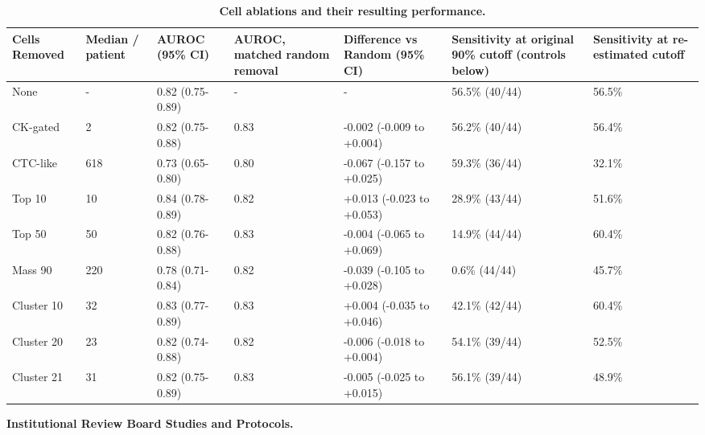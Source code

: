 \documentclass[11pt]{article}
\begin{document}
\clearpage
\begin{table}[p]
\centering
\caption{\textbf{Cell ablations and their resulting performance.}}
\label{stab:3}
\footnotesize
\setlength{\tabcolsep}{4pt}
\begin{tabular}{L{1.8cm} C{1.4cm} L{2.0cm} C{1.7cm} L{2.4cm} L{2.4cm} C{2.0cm}}
\toprule
Cells Removed & Median / patient & AUROC (95\% CI) & AUROC, matched random removal & Difference vs Random (95\% CI) & Sensitivity at original 90\% cutoff (controls below) & Sensitivity at re-estimated cutoff \\
\midrule
None & - & 0.82 (0.75-0.89) & - & - & 56.5\% (40/44) & 56.5\% \\
CK-gated & 2 & 0.82 (0.75-0.88) & 0.83 & -0.002 (-0.009 to +0.004) & 56.2\% (40/44) & 56.4\% \\
CTC-like & 618 & 0.73 (0.65-0.80) & 0.80 & -0.067 (-0.157 to +0.025) & 59.3\% (36/44) & 32.1\% \\
Top 10 & 10 & 0.84 (0.78-0.89) & 0.82 & +0.013 (-0.023 to +0.053) & 28.9\% (43/44) & 51.6\% \\
Top 50 & 50 & 0.82 (0.76-0.88) & 0.83 & -0.004 (-0.065 to +0.069) & 14.9\% (44/44) & 60.4\% \\
Mass 90 & 220 & 0.78 (0.71-0.84) & 0.82 & -0.039 (-0.105 to +0.028) & 0.6\% (44/44) & 45.7\% \\
Cluster 10 & 32 & 0.83 (0.77-0.89) & 0.83 & +0.004 (-0.035 to +0.046) & 42.1\% (42/44) & 60.4\% \\
Cluster 20 & 23 & 0.82 (0.74-0.88) & 0.82 & -0.006 (-0.018 to +0.004) & 54.1\% (39/44) & 52.5\% \\
Cluster 21 & 31 & 0.82 (0.75-0.89) & 0.83 & -0.005 (-0.025 to +0.015) & 56.1\% (39/44) & 48.9\% \\
\bottomrule
\end{tabular}
\end{table}

\begin{table}[!tbp]
\centering
\caption{\textbf{Institutional Review Board Studies and Protocols.}}
\label{stab:4}
\end{table}
\end{document}
